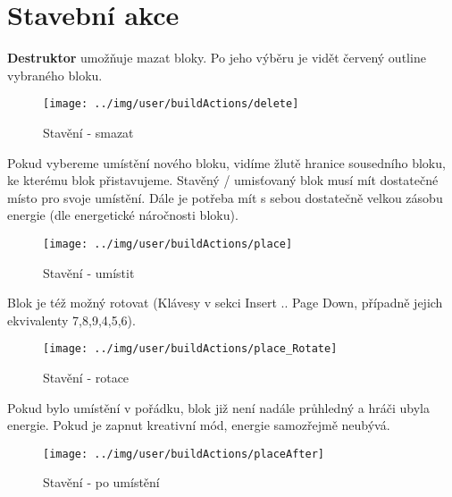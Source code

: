 
\section{Stavební akce}

\textbf{Destruktor} umožňuje mazat bloky. Po jeho výběru je vidět červený outline vybraného bloku.

\begin{figure}[!ht]\centering
\texttt{[image: ../img/user/buildActions/delete]}

\caption{Stavění - smazat}
\label{fig:user_buildActions_delete}

\end{figure}

\FloatBarrier

Pokud vybereme umístění nového bloku, vidíme žlutě hranice sousedního bloku, ke kterému blok přistavujeme. Stavěný / umisťovaný blok musí mít dostatečné místo pro svoje umístění. Dále je potřeba mít s sebou dostatečně velkou zásobu energie (dle energetické náročnosti bloku).

\begin{figure}[!ht]\centering
\texttt{[image: ../img/user/buildActions/place]}

\caption{Stavění - umístit}
\label{fig:user_buildActions_place}

\end{figure}

\FloatBarrier

Blok je též možný rotovat (Klávesy v sekci Insert .. Page Down, případně jejich ekvivalenty 7,8,9,4,5,6).

\begin{figure}[!ht]\centering
\texttt{[image: ../img/user/buildActions/place\_Rotate]}

\caption{Stavění - rotace}
\label{fig:user_buildActions_place_Rotate}

\end{figure}

\FloatBarrier

Pokud bylo umístění v pořádku, blok již není nadále průhledný a hráči ubyla energie. Pokud je zapnut kreativní mód, energie samozřejmě neubývá.

\begin{figure}[!ht]\centering
\texttt{[image: ../img/user/buildActions/placeAfter]}

\caption{Stavění - po umístění}
\label{fig:user_buildActions_placeAfter}

\end{figure}


\FloatBarrier